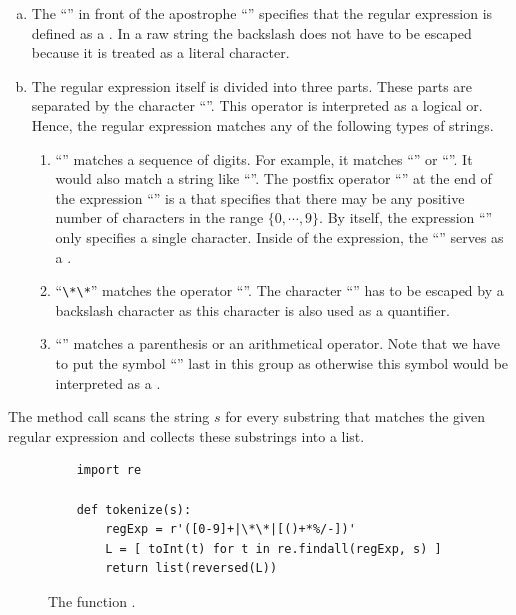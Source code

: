 \begin{enumerate}[(a)]
\item The ``'' in front of the apostrophe ``'' specifies that the regular expression is
      defined as a .  In a raw string the backslash does not have to be
      escaped because it is treated as a literal character.
\item The regular expression itself is divided into three parts.
      These parts are separated by the character ``\mytt{|}''.  This operator is interpreted as a logical or.
      Hence, the regular expression matches any of the following types of strings.
      \begin{enumerate}
      \item ``\mytt{[0-9]+}'' matches a sequence of digits.  For example, it matches ``'' or
            ``''.  It would also match a string like ``''.
            The postfix operator ``\mytt{+}'' at the end of the expression ``\mytt{[0-9]}'' is a
             that specifies that there may be any positive number of characters in the range
            $\{0,\cdots,9\}$.  By itself, the expression ``\mytt{[0-9]}'' only specifies a single character.
            Inside of the expression, the ``\mytt{-}'' serves as a .
      \item ``\verb|\*\*|'' matches the operator ``\mytt{**}''.  The character ``\mytt{*}'' has to be
            escaped by a backslash character as this character is also used as a quantifier.
      \item ``\mytt{[()+*\%/-]}'' matches a parenthesis or an arithmetical operator. Note that we have 
            to put the symbol ``\mytt{-}'' last in this group as otherwise this symbol would be 
            interpreted as a .
     \end{enumerate}
\end{enumerate}
The method call  scans the string $s$ for every substring that matches the
given regular expression and collects these substrings into a list.


\begin{figure}[!ht]
\centering
\begin{verbatim}
    import re

    def tokenize(s):
        regExp = r'([0-9]+|\*\*|[()+*%/-])'
        L = [ toInt(t) for t in re.findall(regExp, s) ]
        return list(reversed(L))                 
\end{verbatim}
\vspace*{-0.3cm}
\caption{The function .}
\label{fig:tokenize.py}
\end{figure}

